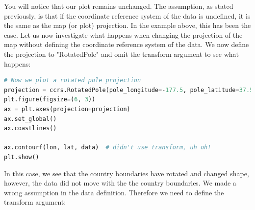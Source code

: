 \documentclass[a4paper , 12pt]{book}
\begin{document}
You will notice that our plot remains unchanged. The assumption, as stated previously, is that if the coordinate reference system of the data is undefined, it is the same as the map (or plot) projection. In the example above, this has been the case. Let us now investigate what happens when changing the projection of the map without defining the coordinate reference system of the data. We now define the projection to "RotatedPole" and omit the transform argument to see what happens:

\begin{center}
\begin{lstlisting}[language=Python, frame=single]
# Now we plot a rotated pole projection
projection = ccrs.RotatedPole(pole_longitude=-177.5, pole_latitude=37.5)
plt.figure(figsize=(6, 3))
ax = plt.axes(projection=projection)
ax.set_global()
ax.coastlines()

ax.contourf(lon, lat, data)  # didn't use transform, uh oh!
plt.show()
\end{lstlisting}
\end{center}

In this case, we see that the country boundaries have rotated and changed shape, however, the data did not move with the the country boundaries. We made a wrong assumption in the data definition. Therefore we need to define the transform argument:
\end{document}
